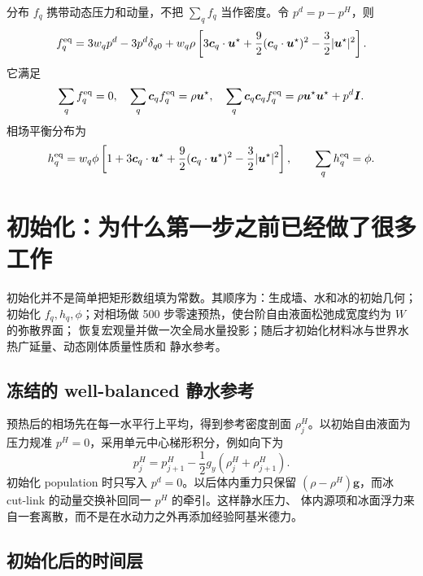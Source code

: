 \documentclass[UTF8,zihao=-4]{ctexart}
\newcommand{\vect}[1]{\boldsymbol{#1}}
\numberwithin{equation}{section}
\begin{document}
分布 $f_q$ 携带动态压力和动量，不把 $\sum_qf_q$ 当作密度。令 $p^d=p-p^H$，则
\begin{equation}
  f_q^{\rm eq}
  =3w_qp^d-3p^d\delta_{q0}
  +w_q\rho\left[3\vect c_q\cdot\vect u^\star
  +\frac92(\vect c_q\cdot\vect u^\star)^2
  -\frac32|\vect u^\star|^2\right].
  \label{eq:pressure-equilibrium}
\end{equation}
它满足
\begin{equation}
  \sum_qf_q^{\rm eq}=0,
  \quad \sum_q\vect c_qf_q^{\rm eq}=\rho\vect u^\star,
  \quad \sum_q\vect c_q\vect c_qf_q^{\rm eq}
  =\rho\vect u^\star\vect u^\star+p^d\vect I.
\end{equation}
相场平衡分布为
\begin{equation}
  h_q^{\rm eq}=w_q\phi\left[1+3\vect c_q\cdot\vect u^\star
  +\frac92(\vect c_q\cdot\vect u^\star)^2
  -\frac32|\vect u^\star|^2\right],
  \qquad \sum_qh_q^{\rm eq}=\phi.
  \label{eq:phase-equilibrium}
\end{equation}

\section{初始化：为什么第一步之前已经做了很多工作}

初始化并不是简单把矩形数组填为常数。其顺序为：生成墙、水和冰的初始几何；初始化
$f_q,h_q,\phi$；对相场做 500 步零速预热，使台阶自由液面松弛成宽度约为 $W$ 的弥散界面；
恢复宏观量并做一次全局水量投影；随后才初始化材料冰与世界水热广延量、动态刚体质量性质和
静水参考。

\subsection{冻结的 well-balanced 静水参考}

预热后的相场先在每一水平行上平均，得到参考密度剖面 $\rho_j^H$。以初始自由液面为压力规准
$p^H=0$，采用单元中心梯形积分，例如向下为
\begin{equation}
  p_j^H=p_{j+1}^H-\frac12g_y(\rho_j^H+\rho_{j+1}^H).
  \label{eq:hydrostatic-trapezoid}
\end{equation}
初始化 population 时只写入 $p^d=0$。以后体内重力只保留
$(\rho-\rho^H)\vect g$，而冰 cut-link 的动量交换补回同一 $p^H$ 的牵引。这样静水压力、
体内源项和冰面浮力来自一套离散，而不是在水动力之外再添加经验阿基米德力。

\subsection{初始化后的时间层}
\end{document}
